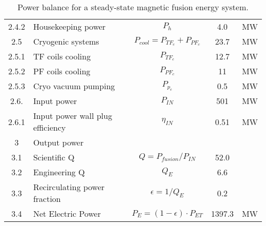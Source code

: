 \begin{table}[ht!]
\begin{tabular}{|c|p{5cm}|c|c|c|}
2.4.2	&	Housekeeping power	&	$P_{{h}}$	&	4.0	&	MW \\
2.5	&	Cryogenic systems	&	$P_{{cool}} = P_{{TF}_c} + P_{{PF}_c}$	&	23.7	&	MW \\
2.5.1	&	TF coils cooling	&	$P_{{TF}_c}$	&	12.7	&	MW \\
2.5.2	&	PF coils cooling	&	$P_{{PF}_c}$	&	11	&	MW \\
2.5.3	&	Cryo vacuum pumping	&	$P_{{p}_c}$	&	0.5	&	MW \\
2.6.	& Input power 	& $P_{IN}$	&	501	&	MW \\
2.6.1	& Input power wall plug efficiency  &	$\eta_{IN}$ & 0.51	&	MW \\
\hline								
3	&	Output power	&		&		&	\\
\hline
3.1	&	Scientific Q	&	$Q = P_{{fusion}}/P_{{IN}}$	&	52.0	&	\\
3.2	&	Engineering Q	&	$Q_{{E}}$	&	6.6	&	\\
3.3	&	Recirculating power fraction	&	$\epsilon = 1/Q_{{E}}$	&	0.2	&	\\
3.4	&	Net Electric Power	&	$P_{{E}} = (1 - \epsilon) \cdot P_{{ET}}$	&	1397.3	&	MW \\
\hline								
\end{tabular}	
\caption{Power balance for a steady-state magnetic fusion energy system.}
\label{tab:powerbalance}
\end{table}





